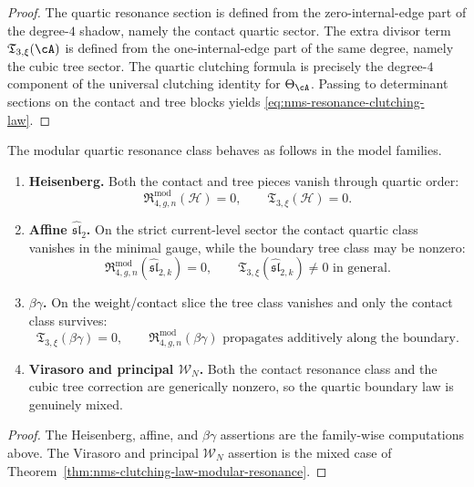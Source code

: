 \begin{proof}
The quartic resonance section is defined from the zero-internal-edge part of the degree-$4$ shadow, namely the contact quartic sector. The extra divisor term $\mathfrak T_{3,\xi}(\cA)$ is defined from the one-internal-edge part of the same degree, namely the cubic tree sector. The quartic clutching formula is precisely the degree-$4$ component of the universal clutching identity for $\Theta_{\cA}$. Passing to determinant sections on the contact and tree blocks yields \eqref{eq:nms-resonance-clutching-law}.\qedhere
\end{proof}

\begin{corollary}
\label{cor:nms-family-boundary-behavior}
The modular quartic resonance class behaves as follows in the model families.
\begin{enumerate}[label=\textup{(\roman*)}]
\item \textbf{Heisenberg.} Both the contact and tree pieces vanish through quartic order:
\[
\mathfrak R_{4,g,n}^{\mathrm{mod}}(\mathcal H)=0,
\qquad
\mathfrak T_{3,\xi}(\mathcal H)=0.
\]
\item \textbf{Affine $\widehat{\mathfrak{sl}}_2$.} On the strict current-level sector the contact quartic class vanishes in the minimal gauge, while the boundary tree class may be nonzero:
\[
\mathfrak R_{4,g,n}^{\mathrm{mod}}(\widehat{\mathfrak{sl}}_{2,k})=0,
\qquad
\mathfrak T_{3,\xi}(\widehat{\mathfrak{sl}}_{2,k})\neq 0
\text{ in general.}
\]
\item \textbf{$\beta\gamma$.} On the weight/contact slice the tree class vanishes and only the contact class survives:
\[
\mathfrak T_{3,\xi}(\beta\gamma)=0,
\qquad
\mathfrak R_{4,g,n}^{\mathrm{mod}}(\beta\gamma)
\text{ propagates additively along the boundary.}
\]
\item \textbf{Virasoro and principal $\mathcal W_N$.} Both the contact resonance class and the cubic tree correction are generically nonzero, so the quartic boundary law is genuinely mixed.
\end{enumerate}
\end{corollary}

\begin{proof}
The Heisenberg, affine, and $\beta\gamma$ assertions are the
family-wise computations above.
The Virasoro and principal $\mathcal W_N$ assertion is the mixed
case of Theorem~\ref{thm:nms-clutching-law-modular-resonance}.\qedhere
\end{proof}

